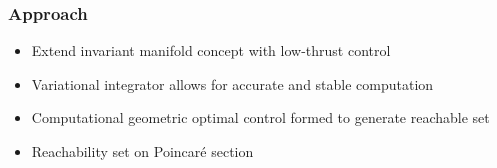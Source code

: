 \begin{frame} %
\frametitle{Approach}

		\begin{itemize}
			\item Extend invariant manifold concept with low-thrust control  
			\item Variational integrator allows for accurate and stable computation
			\item Computational geometric optimal control formed to generate reachable set
			\item Reachability set on Poincar\'e section
		\end{itemize}
\end{frame} %